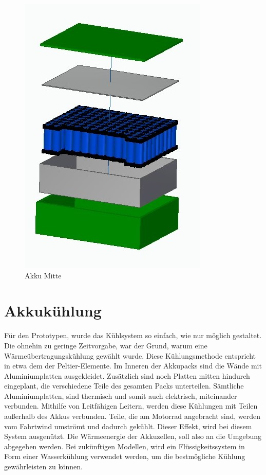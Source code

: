 \begin{figure} [H]
	\begin{center}
		\includegraphics[scale=0.5]{figures/mechanik/Akku_Mitte_Explosion.jpg}
			\caption{Akku Mitte}
			\label{fig:Akku Mitte}
	\end{center}
\end{figure}

\newpage

\section{Akkukühlung} \label{Akkukühlung}

Für den Prototypen, wurde das Kühlsystem so einfach, wie nur möglich gestaltet. Die ohnehin zu geringe Zeitvorgabe, war der Grund, warum eine Wärmeübertragungskühlung gewählt wurde. Diese Kühlungsmethode entspricht in etwa dem der Peltier-Elemente. 
Im Inneren der Akkupacks sind die Wände mit Aluminiumplatten ausgekleidet. Zusätzlich sind noch Platten mitten hindurch eingeplant, die verschiedene Teile des gesamten Packs unterteilen. Sämtliche Aluminiumplatten, sind thermisch und somit auch elektrisch, miteinander verbunden. Mithilfe von Leitfähigen Leitern, werden diese Kühlungen mit Teilen außerhalb des Akkus verbunden. 
Teile, die am Motorrad angebracht sind, werden vom Fahrtwind umströmt und dadurch gekühlt. 
Dieser Effekt, wird bei diesem System ausgenützt. Die Wärmeenergie der Akkuzellen, soll also an die Umgebung abgegeben werden.
Bei zukünftigen Modellen, wird ein Flüssigkeitssystem in Form einer Wasserkühlung verwendet werden, um die bestmögliche Kühlung gewährleisten zu können.

